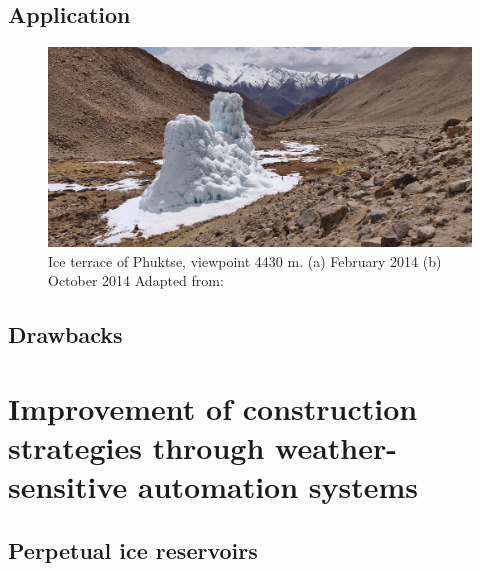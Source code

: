 \subsection{Application}

\begin{figure}[t]
\centering
\includegraphics[width=12cm]{Figures/IS_example.jpg}

\caption{Ice terrace of Phuktse, viewpoint 4430 m. (a) February 2014 (b) October 2014 Adapted from: \cite{nusserSociohydrologyArtificialGlaciers2019}}

\label{fig:ISexample}
\end{figure}

\subsection{Drawbacks}

\section{Improvement of construction strategies through weather-sensitive automation systems}

\subsection{Perpetual ice reservoirs}

